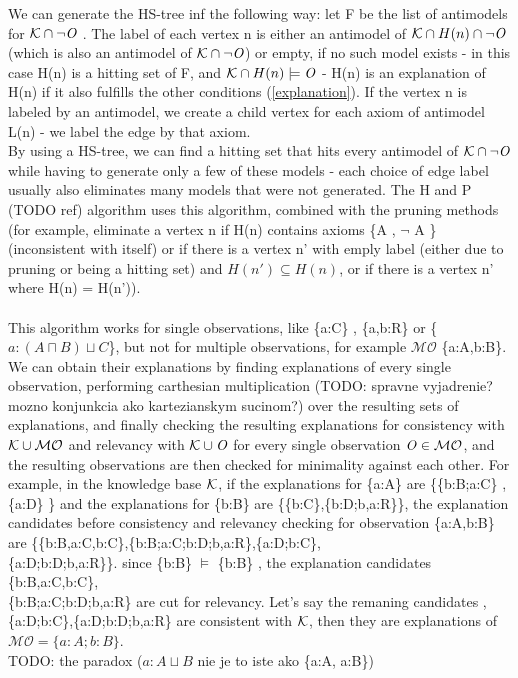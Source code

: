 We can generate the HS-tree inf the following way: let F be the list of antimodels for $\mathcal{K} \cap \neg \mathit{O}$ . The label of each vertex n is either an antimodel of $\mathcal{K} \cap H(n) \cap \neg \mathit{O}$ (which is also an antimodel of $\mathcal{K} \cap \neg \mathit{O}$) or empty, if no such model exists - in this case H(n) is a hitting set of F, and $\mathcal{K} \cap H(n) \models \mathit{O}$ - H(n) is an explanation of H(n) if it also fulfills the other conditions (\ref{explanation}). If the vertex n is labeled by an antimodel, we create a child vertex for each axiom of antimodel L(n) - we label the edge by that axiom. \\
By using a HS-tree, we can find a hitting set that hits every antimodel of $\mathcal{K} \cap \neg \mathit{O}$ while having to generate only a few of these models - each choice of edge label usually also eliminates many models that were not generated. 
The H and P (TODO ref) algorithm uses this algorithm, combined with the pruning methods (for example, eliminate a vertex n if H(n) contains axioms \{A , $\neg$ A \} (inconsistent with itself) or if there is a vertex n' with emply label (either due to pruning or being a hitting set) and $H(n') \subseteq H(n)$, or if there is a vertex n' where H(n) = H(n')).    \\
\\
This algorithm works for single observations, like \{a:C\} , \{a,b:R\} or \{ $a:(A \sqcap B) \sqcup C $\}, but not for multiple observations, for example $\mathcal{MO}$ \{a:A,b:B\}. We can obtain their explanations by finding explanations of every single observation, performing carthesian multiplication (TODO: spravne vyjadrenie? mozno konjunkcia ako kartezianskym sucinom?) over the resulting sets of explanations, and finally checking the resulting explanations for consistency with $\mathcal{K} \cup \mathcal{MO}$ and relevancy with $\mathcal{K} \cup \mathit{O}$ for every single observation $\mathit{O} \in \mathcal{MO} $, and the resulting observations are then checked for minimality against each other. For example, in the knowledge base $\mathcal{K}$, if the explanations for \{a:A\} are \{\{b:B;a:C\} , \{a:D\} \} and the explanations for \{b:B\} are \{\{b:C\},\{b:D;b,a:R\}\}, the explanation candidates before consistency and relevancy checking for observation \{a:A,b:B\} are \{\{b:B,a:C,b:C\},\{b:B;a:C;b:D;b,a:R\},\{a:D;b:C\},\\ \{a:D;b:D;b,a:R\}\}. since   \{b:B\} $\models$ \{b:B\} , the explanation candidates  \{b:B,a:C,b:C\},\\ \{b:B;a:C;b:D;b,a:R\} are cut for relevancy. Let's say the remaning candidates ,\{a:D;b:C\},\{a:D;b:D;b,a:R\} are consistent with $\mathcal{K}$, then they are explanations of $\mathcal{MO} = \{a:A ; b:B\}$. \\
TODO: the paradox ($a:A \sqcup B$ nie je to iste ako \{a:A, a:B\})


